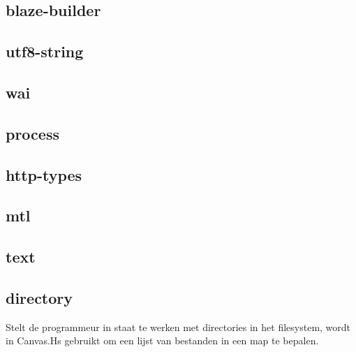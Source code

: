 \subsection{blaze-builder}
\subsection{utf8-string}
\subsection{wai}
\subsection{process}
\subsection{http-types}
\subsection{mtl}
\subsection{text}
\subsection{directory}
Stelt de programmeur in staat te werken met directories in het filesystem, wordt in Canvas.Hs gebruikt om een lijst van bestanden in een map te bepalen.
